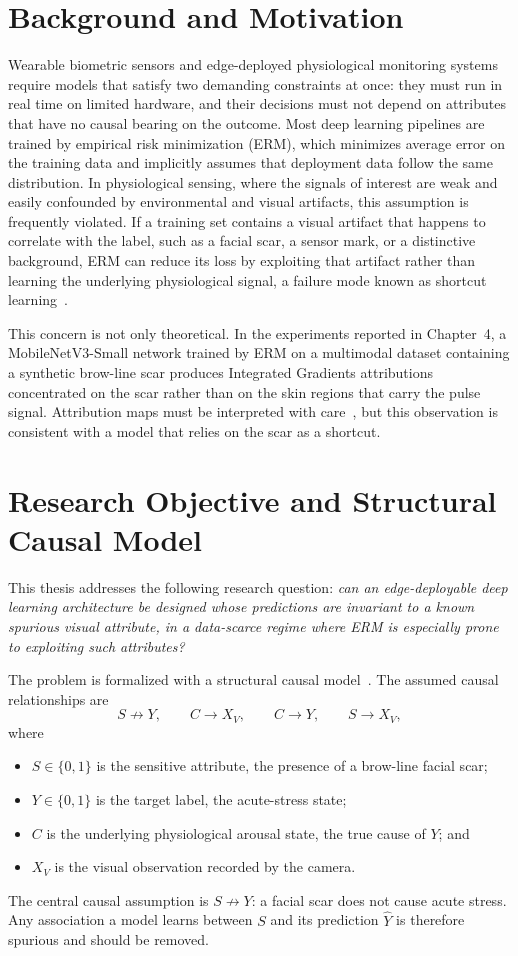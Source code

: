 \section{Background and Motivation}
Wearable biometric sensors and edge-deployed physiological monitoring systems require models that satisfy two demanding constraints at once: they must run in real time on limited hardware, and their decisions must not depend on attributes that have no causal bearing on the outcome. Most deep learning pipelines are trained by empirical risk minimization (ERM), which minimizes average error on the training data and implicitly assumes that deployment data follow the same distribution. In physiological sensing, where the signals of interest are weak and easily confounded by environmental and visual artifacts, this assumption is frequently violated. If a training set contains a visual artifact that happens to correlate with the label, such as a facial scar, a sensor mark, or a distinctive background, ERM can reduce its loss by exploiting that artifact rather than learning the underlying physiological signal, a failure mode known as shortcut learning~\cite{geirhos2020}.

This concern is not only theoretical. In the experiments reported in Chapter~4, a MobileNetV3-Small network trained by ERM on a multimodal dataset containing a synthetic brow-line scar produces Integrated Gradients attributions concentrated on the scar rather than on the skin regions that carry the pulse signal. Attribution maps must be interpreted with care~\cite{adebayo2018}, but this observation is consistent with a model that relies on the scar as a shortcut.

\section{Research Objective and Structural Causal Model}
This thesis addresses the following research question: \emph{can an edge-deployable deep learning architecture be designed whose predictions are invariant to a known spurious visual attribute, in a data-scarce regime where ERM is especially prone to exploiting such attributes?}

The problem is formalized with a structural causal model~\cite{pearl2009}. The assumed causal relationships are
\begin{equation}
S \not\to Y, \qquad C \to X_V, \qquad C \to Y, \qquad S \to X_V,
\end{equation}
where
\begin{itemize}
    \item $S \in \{0,1\}$ is the sensitive attribute, the presence of a brow-line facial scar;
    \item $Y \in \{0,1\}$ is the target label, the acute-stress state;
    \item $C$ is the underlying physiological arousal state, the true cause of $Y$; and
    \item $X_V$ is the visual observation recorded by the camera.
\end{itemize}
The central causal assumption is $S \not\to Y$: a facial scar does not cause acute stress. Any association a model learns between $S$ and its prediction $\hat{Y}$ is therefore spurious and should be removed.

